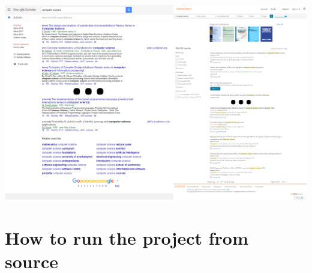 \begin{appendices}
\includegraphics[width=\textwidth]{img/searchexamples.png}

\chapter{How to run the project from source}
\label{appendix:howtorun}

\end{appendices}
